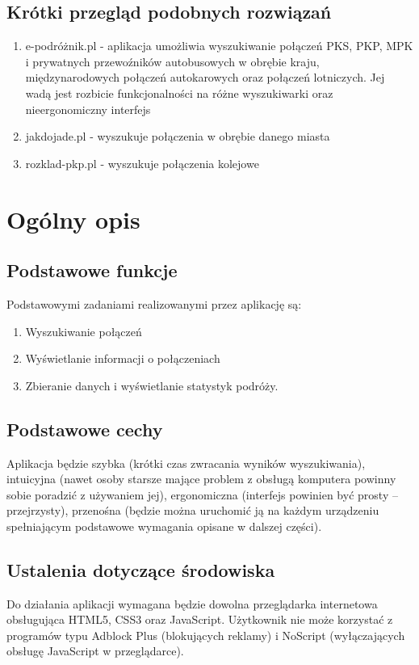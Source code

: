 \documentclass[12pt,a4paper]{report}
\begin{document}
\subsection{Krótki przegląd podobnych rozwiązań}
\begin{enumerate}
	\item e-podróżnik.pl - aplikacja umożliwia wyszukiwanie połączeń PKS, PKP, MPK i prywatnych przewoźników autobusowych w obrębie kraju, międzynarodowych połączeń autokarowych oraz połączeń lotniczych. Jej wadą jest rozbicie funkcjonalności na różne wyszukiwarki oraz nieergonomiczny interfejs
	\item jakdojade.pl - wyszukuje połączenia w obrębie danego miasta
	\item rozklad-pkp.pl - wyszukuje połączenia kolejowe
\end{enumerate}
\section{Ogólny opis}
\subsection{Podstawowe funkcje}
	Podstawowymi zadaniami realizowanymi przez aplikację są:
	\begin{enumerate}
	 	\item Wyszukiwanie połączeń
	 	\item Wyświetlanie informacji o połączeniach
	 	\item Zbieranie danych i wyświetlanie statystyk podróży.
	\end{enumerate}
\subsection{Podstawowe cechy}
	Aplikacja będzie szybka (krótki czas zwracania wyników wyszukiwania), intuicyjna (nawet osoby starsze mające problem z obsługą komputera powinny sobie poradzić z używaniem jej), ergonomiczna (interfejs powinien być prosty -- przejrzysty), przenośna (będzie można uruchomić ją na każdym urządzeniu spełniającym podstawowe wymagania opisane w dalszej części).
\subsection{Ustalenia dotyczące środowiska}
	Do działania aplikacji wymagana będzie dowolna przeglądarka internetowa obsługująca HTML5, CSS3 oraz JavaScript. Użytkownik nie może korzystać z programów typu Adblock Plus (blokujących reklamy) i NoScript (wyłączających obsługę JavaScript w przeglądarce).
\end{document}
